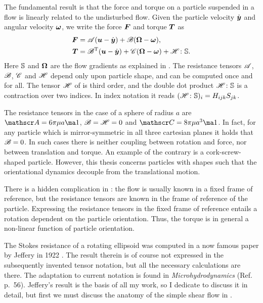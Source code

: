 \documentclass[thesis.tex]{subfiles}
\begin{document}
The fundamental result is that the force and torque on a particle suspended in a flow is linearly related to the undisturbed flow. Given the particle velocity $\dot{\mbox{\boldmath$y$}}$ and angular velocity $\mbox{\boldmath$\omega$}$, we write the force $\mbox{\boldmath$F$}$ and torque $\mbox{\boldmath$T$}$ as
\begin{align}
	\ve F &= \te A (\ve u - \dot{\ve y}) + \te B (\ve \Omega - \ve \omega), \nn \\
	\ve T &= \te B\transpose (\ve u - \dot{\ve y}) + \te C (\ve \Omega - \ve \omega) + \te H \dd \ma S. \eqnlab{resistanceformulation}
\end{align}
Here $\mathbb{S}$ and $\mbox{\boldmath$\Omega$}$ are the flow gradients as explained in . The resistance tensors $\mathscr{A}$, $\mathscr{B}$, $\mathscr{C}$ and $\mathscr{H}$ depend only upon particle shape, and can be computed once and for all. The tensor $\mathscr{H}$ of is third order, and the double dot product $\mathscr{H} \colon \mathbb{S}$ is a contraction over two indices. In index notation it reads $(\mathscr{H} \colon \mathbb{S})_i = H_{ijk}S_{jk}$. 

The resistance tensors in the case of a sphere of radius $a$ are  $\te A = 6\pi\mu a \ma 1$, $\mathscr{B}=\mathscr{H} = 0$ and $\te C = 8\pi\mu a^3 \ma 1$. In fact, for any particle which is mirror-symmetric in all three cartesian planes it holds that $\mathscr{B} = 0$. In such cases there is neither coupling between rotation and force, nor between translation and torque. An example of the contrary is a cork-screw-shaped particle.  However, this thesis concerns particles with shapes such that the orientational dynamics decouple from the translational motion.

There is a hidden complication in : the flow is usually known in a fixed frame of reference, but the resistance tensors are known in the frame of reference of the particle. Expressing the resistance tensors in the fixed frame of reference entails a rotation dependent on the particle orientation. Thus, the torque is in general a non-linear function of particle orientation.

The Stokes resistance of a rotating ellipsoid was computed in a now famous paper by Jeffery in 1922 \cite{jeffery1922}. The result therein is of course not expressed in the subsequently invented tensor notation, but all the necessary calculations are there. The adaptation to current notation is found in \emph{Microhydrodynamics} (Ref.~ p.~56). Jeffery's result is the basis of all my work, so I dedicate  to discuss it in detail, but first we must discuss the anatomy of the simple shear flow in .
\end{document}

